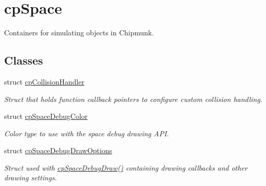 \hypertarget{group__cp_space}{}\section{cp\+Space}
\label{group__cp_space}


Containers for simulating objects in Chipmunk.  


\subsection*{Classes}
\begin{DoxyCompactItemize}
\item 
struct \hyperlink{structcp_collision_handler}{cp\+Collision\+Handler}
\begin{DoxyCompactList}\small\item\em Struct that holds function callback pointers to configure custom collision handling. \end{DoxyCompactList}\item 
struct \hyperlink{structcp_space_debug_color}{cp\+Space\+Debug\+Color}
\begin{DoxyCompactList}\small\item\em Color type to use with the space debug drawing A\+P\+I. \end{DoxyCompactList}\item 
struct \hyperlink{structcp_space_debug_draw_options}{cp\+Space\+Debug\+Draw\+Options}
\begin{DoxyCompactList}\small\item\em Struct used with \hyperlink{group__cp_space_gaa1233930591cb32d25852da2cbe76680}{cp\+Space\+Debug\+Draw()} containing drawing callbacks and other drawing settings. \end{DoxyCompactList}\end{DoxyCompactItemize}
